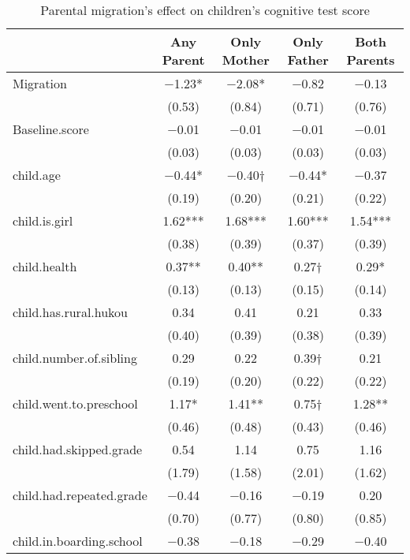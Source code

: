 \documentclass[
  man,floatsintext]{apa7}
\begin{document}
\begin{table}

\caption{Parental migration’s effect on children’s cognitive test score}
\centering
\begin{tabular}[t]{lcccc}
\toprule
  & Any Parent & Only Mother & Only Father & Both Parents\\
\midrule
Migration & \num{-1.23}* & \num{-2.08}* & \num{-0.82} & \num{-0.13}\\
 & (\num{0.53}) & (\num{0.84}) & (\num{0.71}) & (\num{0.76})\\
Baseline.score & \num{-0.01} & \num{-0.01} & \num{-0.01} & \num{-0.01}\\
 & (\num{0.03}) & (\num{0.03}) & (\num{0.03}) & (\num{0.03})\\
child.age & \num{-0.44}* & \num{-0.40}† & \num{-0.44}* & \num{-0.37}\\
 & (\num{0.19}) & (\num{0.20}) & (\num{0.21}) & (\num{0.22})\\
child.is.girl & \num{1.62}*** & \num{1.68}*** & \num{1.60}*** & \num{1.54}***\\
 & (\num{0.38}) & (\num{0.39}) & (\num{0.37}) & (\num{0.39})\\
child.health & \num{0.37}** & \num{0.40}** & \num{0.27}† & \num{0.29}*\\
 & (\num{0.13}) & (\num{0.13}) & (\num{0.15}) & (\num{0.14})\\
child.has.rural.hukou & \num{0.34} & \num{0.41} & \num{0.21} & \num{0.33}\\
 & (\num{0.40}) & (\num{0.39}) & (\num{0.38}) & (\num{0.39})\\
child.number.of.sibling & \num{0.29} & \num{0.22} & \num{0.39}† & \num{0.21}\\
 & (\num{0.19}) & (\num{0.20}) & (\num{0.22}) & (\num{0.22})\\
child.went.to.preschool & \num{1.17}* & \num{1.41}** & \num{0.75}† & \num{1.28}**\\
 & (\num{0.46}) & (\num{0.48}) & (\num{0.43}) & (\num{0.46})\\
child.had.skipped.grade & \num{0.54} & \num{1.14} & \num{0.75} & \num{1.16}\\
 & (\num{1.79}) & (\num{1.58}) & (\num{2.01}) & (\num{1.62})\\
child.had.repeated.grade & \num{-0.44} & \num{-0.16} & \num{-0.19} & \num{0.20}\\
 & (\num{0.70}) & (\num{0.77}) & (\num{0.80}) & (\num{0.85})\\
child.in.boarding.school & \num{-0.38} & \num{-0.18} & \num{-0.29} & \num{-0.40}\\

\end{tabular}
\end{table}
\end{document}
